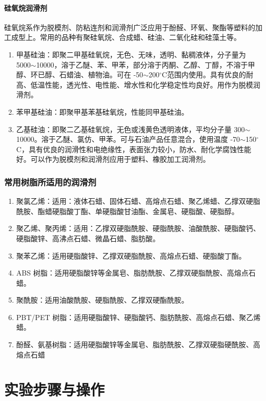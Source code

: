 \documentclass[a4paper, oneside, onecolumn, 12pt]{ctexrep}    %
\newcommand{\cd}{$^{\circ}$C}  %
\begin{document}
\subsubsection{硅氧烷润滑剂}
硅氧烷系作为脱模剂、防粘连剂和润滑剂广泛应用于酚醛、环氧、聚酯等塑料的加工成型上。常用的品种有聚硅氧烷、合成蜡、硅油、二氧化硅和硅藻土等。

\begin{enumerate}
    \item[\ding{192}] 甲基硅油：即聚二甲基硅氧烷，无色、无味，透明、黏稠液体，分子量为 5000$\sim$10000，溶于乙醚、苯、甲苯，部分溶于丙酮、乙醇、丁醇，不溶于甲醇、环已醇、石蜡油、植物油。可在 -50$\sim$200\cd 范围内使用。具有优良的耐高、低温性能，透光性、电性能、增水性和化学稳定性均良好。用作为脱模润滑剂。
    \item[\ding{193}] 苯甲基硅油：即聚甲基苯基硅氧烷，性能同甲基硅油。
    \item[\ding{194}] 乙基硅油：即聚二乙基硅氧烷，无色或浅黄色透明液体，平均分子量 300$\sim$10000。溶于乙醚、氯仿、甲苯。可与石油产品任意混合，使用温度 -70$\sim$150\cd，具有优良的润滑性和电绝缘性，表面张力较小，防水、耐化学腐蚀性能好。可以作为脱模剂和润滑剂应用于塑料、橡胶加工润滑剂。
\end{enumerate}

\subsection{常用树脂所适用的润滑剂}
\begin{enumerate}[(1) ]
    \item 聚氯乙烯：适用：液体石蜡、固体石蜡、高熔点石蜡、聚乙烯蜡、乙撑双硬脂酰胺、酯蜡硬脂酸丁酯、单硬脂酸甘油酯、金属皂、硬脂酸、硬脂醇。
    \item 聚乙烯、聚丙烯：适用：乙撑双硬脂酰胺、硬脂酰胺、油酸酰胺、硬脂酸钙、硬脂酸锌、高沸点石蜡、微晶石蜡、脂肪酸。
    \item 聚苯乙烯：适用硬脂酸锌、乙撑双硬脂酰胺、高熔点石蜡、硬脂酸丁酯。
    \item ABS 树脂：适用硬脂酸锌等金属皂、脂肪酰胺、乙撑双硬脂酰胺、高熔点石蜡。
    \item 聚酰胺：适用油酸酰胺、硬脂酰胺、乙撑双硬酯酰胺。
    \item PBT/PET 树脂：适用硬脂酸锌、硬脂酸钙、脂肪酰胺、高熔点石蜡、聚乙烯蜡。
    \item 酚醛、氨基树脂：适用硬脂酸锌等金属皂、脂肪酰胺、乙撑双硬脂硬酰胺、高熔点石蜡
\end{enumerate}

\chapter{实验步骤与操作}
\end{document}
